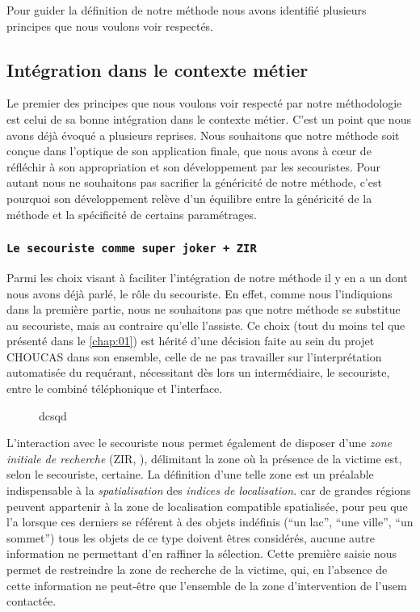 Pour guider la définition de notre méthode nous avons identifié
plusieurs principes que nous voulons voir respectés.

\subsection{Intégration dans le contexte métier}

Le premier des principes que nous voulons voir respecté par notre
méthodologie est celui de sa bonne intégration dans le contexte
métier.
%
C'est un point que nous avons déjà évoqué a plusieurs reprises. Nous
souhaitons que notre méthode soit conçue dans l'optique de son
application finale, \ie que nous avons à cœur de réfléchir à son
appropriation et son développement par les secouristes. Pour autant
nous ne souhaitons pas sacrifier la généricité de notre méthode, c'est
pourquoi son développement relève d'un équilibre entre la généricité
de la méthode et la spécificité de certains paramétrages.

\subsubsection{\texttt{Le secouriste comme super joker + ZIR}}

Parmi les choix visant à faciliter l'intégration de notre méthode il y
en a un dont nous avons déjà parlé, le rôle du secouriste. En effet,
comme nous l'indiquions dans la première partie, nous ne souhaitons
pas que notre méthode se substitue au secouriste, mais au contraire
qu'elle l’assiste. Ce choix (tout du moins tel que présenté dans le
\autoref{chap:01}) est hérité d'une décision faite au sein du projet
CHOUCAS dans son ensemble, celle de ne pas travailler sur
l'interprétation automatisée du requérant, nécessitant dès lors un
intermédiaire, le secouriste, entre le combiné téléphonique et
l'interface.

\begin{figure}
  \centering
  \caption{dcsqd}
  \label{fig:diag_acti_secours}
\end{figure}

L'interaction avec le secouriste nous permet également de disposer
d'une \emph{zone initiale de recherche} (ZIR, \cite{Viry2019}),
délimitant la zone où la présence de la victime est, selon le
secouriste, certaine. La définition d'une telle zone est un préalable
indispensable à la \emph{spatialisation} des \emph{indices de
  localisation.}
%
car de grandes régions peuvent appartenir à la zone de
localisation compatible spatialisée, pour peu que l'a
%
lorsque ces derniers se référent à des objets
indéfinis (\eg \enquote{un lac}, \enquote{une ville}, \enquote{un
  sommet}) tous les objets de ce type doivent êtres considérés, aucune
autre information ne permettant d'en raffiner la sélection. Cette
première saisie nous permet de restreindre la zone de recherche de la
victime, qui, en l'absence de cette information ne peut-être que
l'ensemble de la zone d'intervention de l'\ac{usem} contactée.

